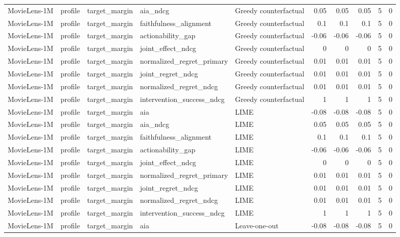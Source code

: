 \begin{table}[t]
{\begin{tabular}{lllllrrrrr}
MovieLens-1M & profile & target\_margin & aia\_ndcg & Greedy counterfactual & 0.05 & 0.05 & 0.05 & 5 & 0 \\
MovieLens-1M & profile & target\_margin & faithfulness\_alignment & Greedy counterfactual & 0.1 & 0.1 & 0.1 & 5 & 0 \\
MovieLens-1M & profile & target\_margin & actionability\_gap & Greedy counterfactual & -0.06 & -0.06 & -0.06 & 5 & 0 \\
MovieLens-1M & profile & target\_margin & joint\_effect\_ndcg & Greedy counterfactual & 0 & 0 & 0 & 5 & 0 \\
MovieLens-1M & profile & target\_margin & normalized\_regret\_primary & Greedy counterfactual & 0.01 & 0.01 & 0.01 & 5 & 0 \\
MovieLens-1M & profile & target\_margin & joint\_regret\_ndcg & Greedy counterfactual & 0.01 & 0.01 & 0.01 & 5 & 0 \\
MovieLens-1M & profile & target\_margin & normalized\_regret\_ndcg & Greedy counterfactual & 0.01 & 0.01 & 0.01 & 5 & 0 \\
MovieLens-1M & profile & target\_margin & intervention\_success\_ndcg & Greedy counterfactual & 1 & 1 & 1 & 5 & 0 \\
MovieLens-1M & profile & target\_margin & aia & LIME & -0.08 & -0.08 & -0.08 & 5 & 0 \\
MovieLens-1M & profile & target\_margin & aia\_ndcg & LIME & 0.05 & 0.05 & 0.05 & 5 & 0 \\
MovieLens-1M & profile & target\_margin & faithfulness\_alignment & LIME & 0.1 & 0.1 & 0.1 & 5 & 0 \\
MovieLens-1M & profile & target\_margin & actionability\_gap & LIME & -0.06 & -0.06 & -0.06 & 5 & 0 \\
MovieLens-1M & profile & target\_margin & joint\_effect\_ndcg & LIME & 0 & 0 & 0 & 5 & 0 \\
MovieLens-1M & profile & target\_margin & normalized\_regret\_primary & LIME & 0.01 & 0.01 & 0.01 & 5 & 0 \\
MovieLens-1M & profile & target\_margin & joint\_regret\_ndcg & LIME & 0.01 & 0.01 & 0.01 & 5 & 0 \\
MovieLens-1M & profile & target\_margin & normalized\_regret\_ndcg & LIME & 0.01 & 0.01 & 0.01 & 5 & 0 \\
MovieLens-1M & profile & target\_margin & intervention\_success\_ndcg & LIME & 1 & 1 & 1 & 5 & 0 \\
MovieLens-1M & profile & target\_margin & aia & Leave-one-out & -0.08 & -0.08 & -0.08 & 5 & 0 \\

\end{tabular}}
\end{table}

